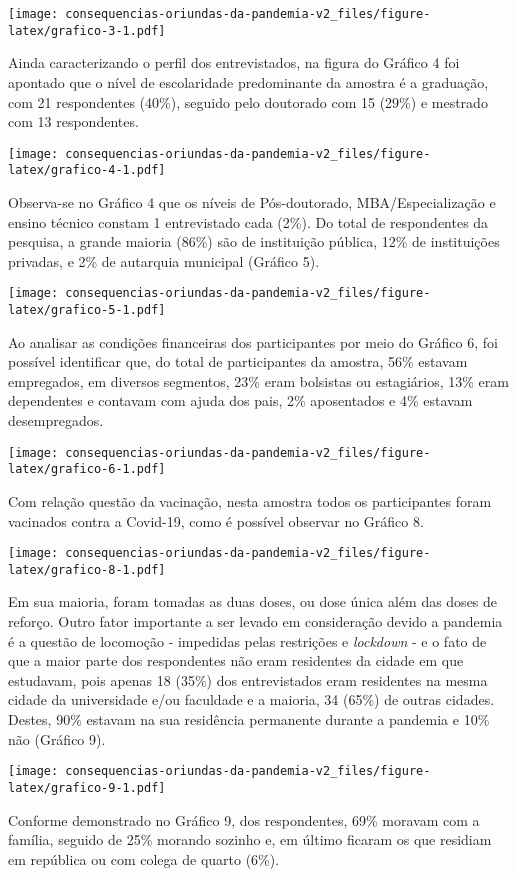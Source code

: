 \documentclass[
]{article}
\begin{document}
\texttt{[image: consequencias-oriundas-da-pandemia-v2\_files/figure-latex/grafico-3-1.pdf]}

Ainda caracterizando o perfil dos entrevistados, na figura do Gráfico 4
foi apontado que o nível de escolaridade predominante da amostra é a
graduação, com 21 respondentes (40\%), seguido pelo doutorado com 15
(29\%) e mestrado com 13 respondentes.

\texttt{[image: consequencias-oriundas-da-pandemia-v2\_files/figure-latex/grafico-4-1.pdf]}

Observa-se no Gráfico 4 que os níveis de Pós-doutorado,
MBA/Especialização e ensino técnico constam 1 entrevistado cada (2\%).
Do total de respondentes da pesquisa, a grande maioria (86\%) são de
instituição pública, 12\% de instituições privadas, e 2\% de autarquia
municipal (Gráfico 5).

\texttt{[image: consequencias-oriundas-da-pandemia-v2\_files/figure-latex/grafico-5-1.pdf]}

Ao analisar as condições financeiras dos participantes por meio do
Gráfico 6, foi possível identificar que, do total de participantes da
amostra, 56\% estavam empregados, em diversos segmentos, 23\% eram
bolsistas ou estagiários, 13\% eram dependentes e contavam com ajuda dos
pais, 2\% aposentados e 4\% estavam desempregados.

\texttt{[image: consequencias-oriundas-da-pandemia-v2\_files/figure-latex/grafico-6-1.pdf]}

Com relação questão da vacinação, nesta amostra todos os participantes
foram vacinados contra a Covid-19, como é possível observar no Gráfico
8.

\texttt{[image: consequencias-oriundas-da-pandemia-v2\_files/figure-latex/grafico-8-1.pdf]}

Em sua maioria, foram tomadas as duas doses, ou dose única além das
doses de reforço. Outro fator importante a ser levado em consideração
devido a pandemia é a questão de locomoção - impedidas pelas restrições
e \emph{lockdown} - e o fato de que a maior parte dos respondentes não
eram residentes da cidade em que estudavam, pois apenas 18 (35\%) dos
entrevistados eram residentes na mesma cidade da universidade e/ou
faculdade e a maioria, 34 (65\%) de outras cidades. Destes, 90\% estavam
na sua residência permanente durante a pandemia e 10\% não (Gráfico 9).

\texttt{[image: consequencias-oriundas-da-pandemia-v2\_files/figure-latex/grafico-9-1.pdf]}

Conforme demonstrado no Gráfico 9, dos respondentes, 69\% moravam com a
família, seguido de 25\% morando sozinho e, em último ficaram os que
residiam em república ou com colega de quarto (6\%).
\end{document}

